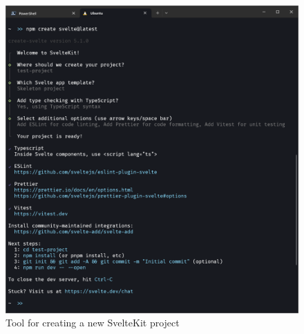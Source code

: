 \begin{figure}
    \centering
    \includegraphics[width=.95\linewidth,trim={0 15cm 0 1.5cm},clip]{assets/sveltekit-project-setup}
    \caption{Tool for creating a new SvelteKit project}
    \label{fig:project-setup}
\end{figure}










